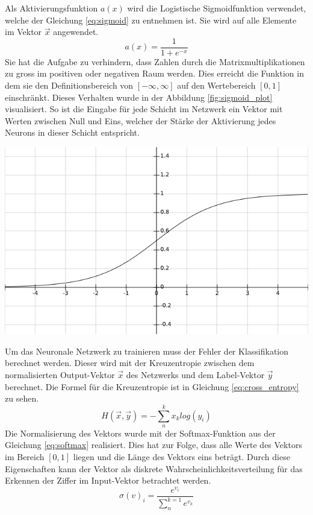 \documentclass[Interploate_hadwritten_Digits.tex]{subfiles}
\begin{document}
	Als Aktivierungsfunktion $ a(x) $ wird die Logistische Sigmoidfunktion verwendet, welche der Gleichung \ref{eq:sigmoid} zu entnehmen ist. Sie wird auf alle Elemente im Vektor $ \vec{x} $ angewendet. 
	\begin{equation}
	a(x)=\frac{1}{1+e^{-x}}
	\label{eq:sigmoid}
	\end{equation}
	Sie hat die Aufgabe zu verhindern, dass Zahlen durch die Matrixmultiplikationen zu gross im positiven oder negativen Raum werden. Dies erreicht die Funktion in dem sie den Definitionsbereich von $ [-\infty, \infty] $ auf den Wertebereich $ [0, 1] $ einschränkt. Dieses Verhalten wurde in der Abbildung \ref{fig:sigmoid_plot} visualisiert. So ist die Eingabe für jede Schicht im Netzwerk ein Vektor mit Werten zwischen Null und Eins, welcher der Stärke der Aktivierung jedes Neurons in dieser Schicht entspricht.
	\begin{Figure}
		\centering
		\includegraphics[width=\linewidth]{img/sigmoid_plot.png}
		\label{fig:sigmoid_plot}
	\end{Figure}

	Um das Neuronale Netzwerk zu trainieren muss der Fehler der Klassifikation berechnet werden. Dieser wird mit der Kreuzentropie zwischen dem normalisierten Output-Vektor $ \vec{x} $ des Netzwerks und dem Label-Vektor $ \vec{y} $ berechnet. Die Formel für die Kreuzentropie ist in Gleichung \ref{eq:cross_entropy} zu sehen.
	\begin{equation}
	H(\vec{x}, \vec{y}) = -\sum_{n}^{k}x_{k}log(y_{i})
	\label{eq:cross_entropy}
	\end{equation}
	Die Normalisierung des Vektors wurde mit der Softmax-Funktion aus der Gleichung \ref{eq:softmax}  realisiert. Dies hat zur Folge, dass alle Werte des Vektors im Bereich $ [0, 1] $ liegen und die Länge des Vektors eins beträgt. Durch diese Eigenschaften kann der Vektor als diskrete Wahrscheinlichkeitsverteilung für das Erkennen der Ziffer im Input-Vektor betrachtet werden.
	\begin{equation}
	\sigma(v)_{i} = \frac{e^{v_{i}}}{\sum_{n}^{k=1}e^{v_{k}}}
	\label{eq:softmax}
	\end{equation}
	
\end{document}
